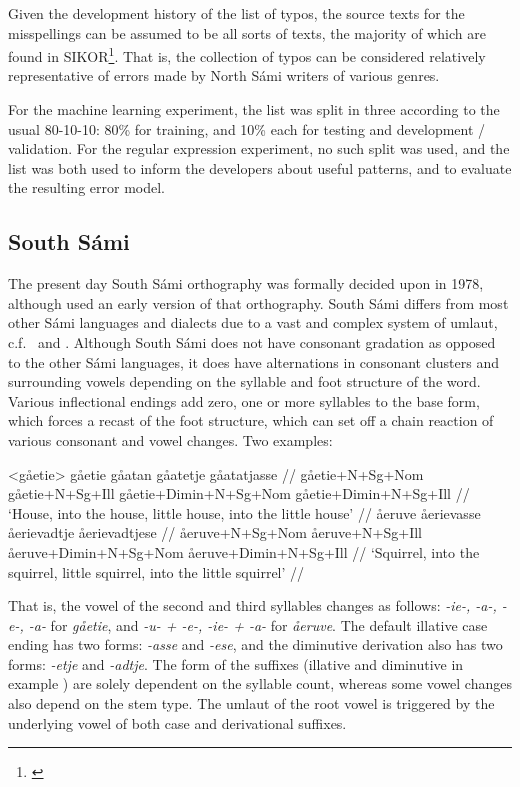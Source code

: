 \documentclass{flammie}
\begin{document}
Given the development history of the list of typos, the source texts for the
misspellings can be assumed to be all sorts of texts, the majority of which are
found in SIKOR\footnote{\cite{sikor_06.11.2018}}. That is, the collection of
typos can be considered relatively representative of errors made by North Sámi
writers of various genres.

For the machine learning experiment, the list was split in three according to
the usual 80-10-10: 80\% for training, and 10\% each for testing and development
/ validation. For the regular expression experiment, no such split was used, and
the list was both used to inform the developers about useful patterns, and to
evaluate the resulting error model.

\subsection{South Sámi}

The present day South Sámi orthography was formally decided upon in 1978,
although \cite{bull_bergsland_1974} used an early version of that orthography.
South Sámi differs from most other Sámi languages and dialects due to a vast and
complex system of umlaut, c.f.~\cite{Bergsland1994} and \cite{Magga2012}.
Although South Sámi does not have consonant gradation as opposed to the other
Sámi languages, it does have alternations in consonant clusters and surrounding
vowels depending on the syllable and foot structure of the word. Various
inflectional endings add zero, one or more syllables to the base form, which
forces a recast of the foot structure, which can set off a chain reaction of
various consonant and vowel changes. Two examples:

\pex<gåetie>
\a
\begingl
\gla gåetie gåatan gåatetje gåatatjasse //
\glb gåetie+N+Sg+Nom gåetie+N+Sg+Ill gåetie+Dimin+N+Sg+Nom gåetie+Dimin+N+Sg+Ill //
\glft `House, into the house, little house, into the little house' //
\endgl
\a
\begingl
\gla åeruve åerievasse åerievadtje åerievadtjese //
\glb åeruve+N+Sg+Nom åeruve+N+Sg+Ill åeruve+Dimin+N+Sg+Nom åeruve+Dimin+N+Sg+Ill //
\glft `Squirrel, into the squirrel, little squirrel, into the little squirrel' //
\endgl
\xe

That is, the vowel of the second and third syllables changes as follows:
\textit{-ie-, -a-, -e-, -a-} for \textit{gåetie}, and \textit{-u- + -e-, -ie- +
-a-} for \textit{åeruve}. The default illative case ending has two forms:
\textit{-asse} and \textit{-ese}, and the diminutive derivation also has two
forms: \textit{-etje} and \textit{-adtje}. The form of the suffixes (illative
and diminutive in example ) are solely dependent on the syllable
count, whereas some vowel changes also depend on the stem type. The umlaut of
the root vowel is triggered by the underlying vowel of both case and
derivational suffixes.
\end{document}
